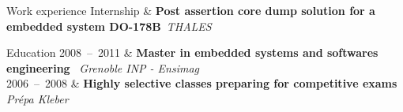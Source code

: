 \documentclass{cv}
\newcommand{\lieu}[1]{\textsl{#1}\ }
\newcommand{\activite}[1]{\textbf{#1}\ }
\newcommand{\comment}[1]{{#1}\ }
\newcommand{\group}[1]{\hspace{1em}\textsl{#1}\ }
\newcommand{\hs}{\hspace{1.6em}}
\begin{document}
\begin{rubriquetableau}[2.5cm]{Work experience}
Internship               & \activite{Post assertion core dump solution for a embedded system DO-178B}\lieu{THALES}\\
%
\end{rubriquetableau}


\begin{rubriquetableau}[2.5cm]{Education}
2008~--~2011            & \activite{Master in embedded systems and softwares engineering} \lieu{Grenoble INP - Ensimag} \\
2006~--~2008            & \activite{Highly selective classes preparing for competitive exams} \lieu{Prépa Kleber}
\end{rubriquetableau}

\end{document}
